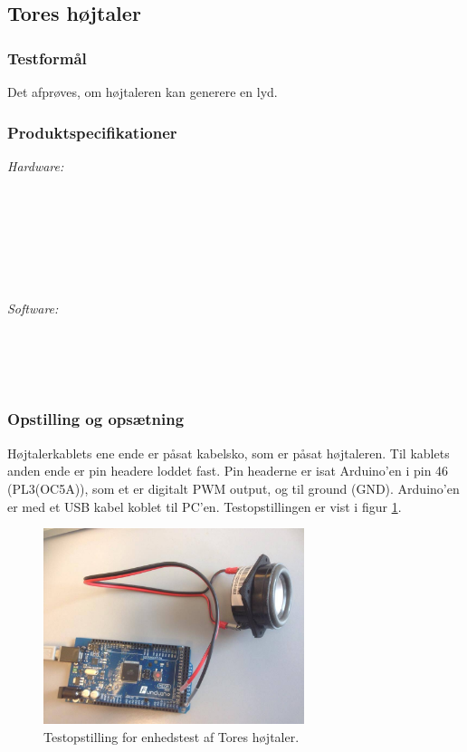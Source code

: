	\subsection{Tores højtaler}
		\subsubsection{Testformål}
		Det afprøves, om højtaleren kan generere en lyd.
		\subsubsection{Produktspecifikationer}
	
	
		\textit{Hardware:}\\
		\tores\\
		\\
		\kabelsko\\
		\pins\\
		\arduino\\
		\PC\\
		\usbkabel\\
	
		\textit{Software:}\\
		\labview\\
		\visa\\
		\vi\\
		\ardsw\
	
		\subsubsection{Opstilling og opsætning}
		Højtalerkablets ene ende er påsat kabelsko, som er påsat højtaleren. Til kablets anden ende er pin headere loddet fast. Pin headerne er isat Arduino'en i pin 46 (PL3(OC5A)), som et er digitalt PWM output, og til ground (GND). 
		Arduino'en er med et USB kabel koblet til PC'en. Testopstillingen er vist i figur \ref{fig:ethb}.\\ 
	  
			\begin{figure}[htb]
			\centering
				\includegraphics[width=3in]{hbArduino}
				\caption{Testopstilling for enhedstest af Tores højtaler.}	
				\label{fig:ethb}
			\end{figure}
	
